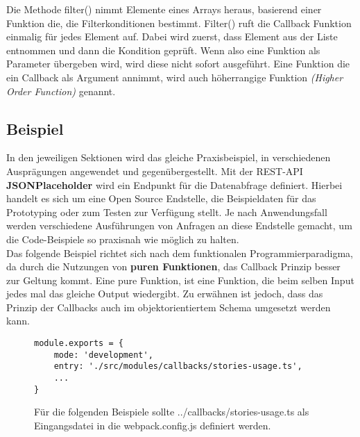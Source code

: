 \noindent
Die Methode filter() nimmt Elemente eines Arrays heraus, basierend einer Funktion die, die Filterkonditionen bestimmt. Filter() ruft die Callback Funktion einmalig für jedes Element auf. Dabei wird zuerst, dass Element aus der Liste entnommen und dann die Kondition geprüft. Wenn also eine Funktion als Parameter übergeben wird, wird diese nicht sofort ausgeführt. Eine Funktion die ein Callback als Argument annimmt, wird auch höherrangige Funktion \textit{(Higher Order Function)} genannt\cite{callbacks-example}.

\subsection{Beispiel}
In den jeweiligen Sektionen wird das gleiche Praxisbeispiel, in verschiedenen Ausprägungen angewendet und gegenübergestellt. Mit der REST-API \textbf{JSONPlaceholder} wird ein Endpunkt für die Datenabfrage definiert. Hierbei handelt es sich um eine Open Source Endstelle, die Beispieldaten für das Prototyping oder zum Testen zur Verfügung stellt. Je nach Anwendungsfall werden verschiedene Ausführungen von Anfragen an diese Endstelle gemacht, um die Code-Beispiele so praxisnah wie möglich zu halten.\\

\noindent
Das folgende Beispiel richtet sich nach dem funktionalen Programmierparadigma, da durch die Nutzungen von \textbf{puren Funktionen}, das Callback Prinzip besser zur Geltung kommt. Eine pure Funktion, ist eine Funktion, die beim selben Input jedes mal das gleiche Output wiedergibt. Zu erwähnen ist jedoch, dass das Prinzip der Callbacks auch im objektorientiertem Schema umgesetzt werden kann. 

\begin{figure}[H]
\begin{lstlisting}[basicstyle=\small]
module.exports = {
    mode: 'development',
    entry: './src/modules/callbacks/stories-usage.ts',
    ...
}
\end{lstlisting}
\caption{Für die folgenden Beispiele sollte ../callbacks/stories-usage.ts als Eingangsdatei in die webpack.config.js definiert werden.}
\end{figure}

